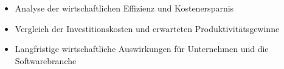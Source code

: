 \begin{itemize}
    \item Analyse der wirtschaftlichen Effizienz und Kostenersparnis
    \item Vergleich der Investitionskosten und erwarteten Produktivitätsgewinne
    \item Langfristige wirtschaftliche Auswirkungen für Unternehmen und die Softwarebranche
\end{itemize}